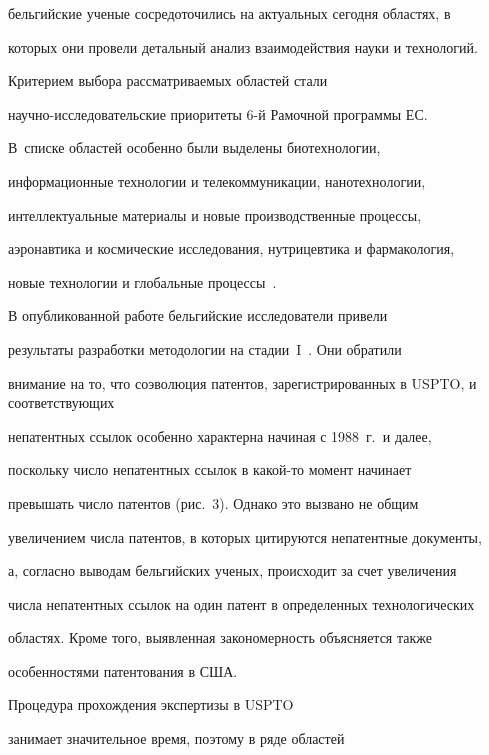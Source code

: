 бельгийские ученые сосредоточились на актуальных сегодня областях, в 


которых они провели детальный анализ взаимодействия науки и технологий. 


Критерием выбора рассматриваемых областей стали 


     научно-исследовательские приоритеты 6-й Рамочной программы ЕС. 


В~списке областей особенно были выделены биотехнологии, 


информационные технологии и телекоммуникации, нанотехнологии, 


интеллектуальные материалы и новые производственные процессы, 


аэронавтика и космические исследования, нутрицевтика и фармакология, 


новые технологии и глобальные процессы~\cite{2-koz}. 


     


     В опубликованной работе бельгийские исследователи привели 


результаты разработки методологии на стадии~I~\cite{2-koz}. Они обратили 


внимание на то, что соэволюция патентов, зарегистрированных в USPTO, и соответствующих 


непатентных ссылок особенно характерна начиная с 1988~г.\ и далее, 


поскольку число непатентных ссылок в какой-то момент начинает 


превышать число патентов (рис.~3). Однако это вызвано не общим 


увеличением числа патентов, в которых цитируются непатентные документы, 


а, согласно выводам бельгийских ученых, происходит за счет увеличения 


числа непатентных ссылок на один патент в определенных технологических 


областях. Кроме того, выявленная закономерность объясняется также 


особенностями патентования в США.











     Процедура прохождения экспертизы в USPTO 


     занимает значительное время, поэтому в ряде областей 


